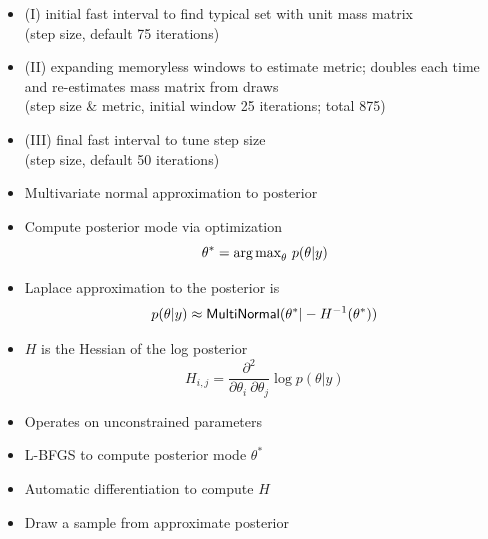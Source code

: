 \documentclass[10pt]{report}
\begin{document}
%
\begin{itemize}
\item (I) initial fast interval to find typical set with unit mass matrix
\\
(step size,   default 75 iterations)
\item (II) expanding memoryless windows to estimate metric; doubles each time and re-estimates mass matrix from draws
\\
(step size \& metric, initial window 25 iterations; total 875)
\item (III) final fast interval to tune step size
  \\
  (step size, default 50 iterations)
\end{itemize}


%
\begin{itemize}
\item Multivariate normal approximation to posterior
\item Compute posterior mode via optimization
\[
\theta^{*} = \mbox{arg\,max}_{\theta} \  p(\theta | y)
\]
\item Laplace approximation to the posterior is
\[
p(\theta | y)
\approx
\text{\sf MultiNormal}(\theta^{*} | -H^{-1}(\theta^*))
\]
\item $H$ is the Hessian of the log posterior
\[
H_{i,j}
= \frac{\partial^2}{\partial \theta_i \ \partial \theta_j}
  \log p(\theta | y)
\]
\end{itemize}


%
\begin{itemize}
\item Operates on unconstrained parameters
\item L-BFGS to compute posterior mode $\theta^*$
\item Automatic differentiation to compute $H$
\item Draw a sample from approximate posterior
\end{itemize}
\end{document}

